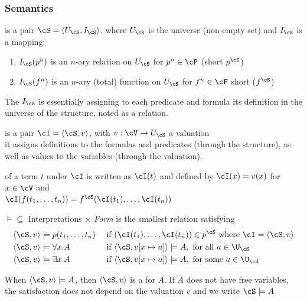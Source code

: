 \subsubsection{Semantics}
\inlinedefinition[Structure] is a pair $\cS = \langle U_\cS, I_\cS \rangle$, where $U_\cS$ is the universe (non-empty set) and $I_\cS$ is a mapping:
\begin{enumerate}
    \item $I_\cS(p^n)$ is an $n$-ary relation on $U_\cS$ for $p^n \in \cP$ (short $p^\cS$)
    \item $I_\cS(f^n)$ is an $n$-ary (total) function on $U_\cS$ for $f^n \in \cF$ short ($f^\cS$)
\end{enumerate}
\inlineintuition The $I_\cS$ is essentially assigning to each predicate and formula its definition in the universe of the structure, noted as a relation.

\inlinedefinition[Interpretation] is a pair $\cI = \langle \cS, v \rangle$, with $v : \cV \rightarrow U_\cS$ a valuation\\
\inlineintuition it assigns definitions to the formulas and predicates (through the structure), as well as values to the variables (through the valuation).

\inlinedefinition[Value] of a term $t$ under $\cI$ is written as $\cI(t)$ and defined by $\cI(x) = v(x)$ for $x \in \cV$ and\\
$\cI(f(t_1, \ldots, t_n)) = f^\cS(\cI(t_1), \ldots, \cI(t_n))$

\inlinedefinition[Satisfiability] $\models \subseteq$ Interpretations $\times$ \textit{Form} is the smallest relation satisfying
\begin{align*}
     & \langle \cS, v \rangle \models p(t_1, \ldots, t_n) &  & \text{ if } (\cI(t_1), \ldots, \cI(t_n)) \in p^\cS \text{ where } \cI = \langle \cS, v \rangle \\
     & \langle \cS, v \rangle \models \forall x. A        &  & \text{ if } \langle \cS, v[x \mapsto a] \rangle \models A, \text{ for all } a \in \U_\cS       \\
     & \langle \cS, v \rangle \models \exists x. A        &  & \text{ if } \langle \cS, v[x \mapsto a] \rangle \models A, \text{ for some } a \in \U_\cS      \\
\end{align*}

\inlinedefinition[Model] When $\langle \cS, v \rangle \models A$, then $\langle \cS, v \rangle$ is a  for $A$.
If $A$ does not have free variables, the satisfaction does not depend on the valuation $v$ and we write $\cS \models A$

